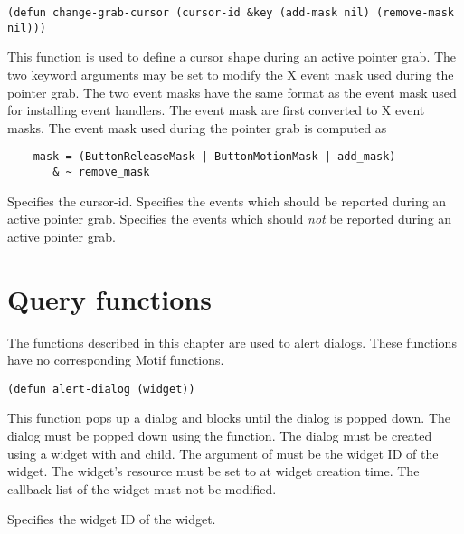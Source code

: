 \begin{lispd}
\syntax\fnsize\begin{verbatim}
(defun change-grab-cursor (cursor-id &key (add-mask nil) (remove-mask nil)))
\end{verbatim}\normalsize
{}
\beschr This function is used to define a cursor shape during an active pointer
grab. The two keyword arguments may be set to modify the X event mask used
during the pointer grab. The two event masks have the same format as the
event mask used for installing event handlers. The event mask are first converted to X event masks. The event mask used during the pointer grab is computed as

\begin{verbatim}
    mask = (ButtonReleaseMask | ButtonMotionMask | add_mask)
	   & ~ remove_mask
\end{verbatim}

\parameter
\begin{paramd}
 Specifies the cursor-id.
 Specifies the events which should be reported during an active
pointer grab.
 Specifies the events which should {\em not} be reported
during an active pointer grab.
\end{paramd}
\end{lispd}

\chapter{Query functions}

The functions described in this chapter are used to alert dialogs. These 
functions have no corresponding Motif functions.

\begin{lispd}
\syntax\begin{verbatim}
(defun alert-dialog (widget))
\end{verbatim}
\beschr This function pops up a dialog and blocks until the dialog is popped
down.  The dialog must be popped down using the  function.
The dialog must be created using a  widget with and
 child.  The  argument of
 must be the widget ID of the  widget.
\hinweis The  widget's  resource must
be set to  at widget creation time.  The  callback list of
the  widget must not be modified. 
\parameter
\begin{paramd}
 Specifies the widget ID of the  widget.
\end{paramd}
\end{lispd}

